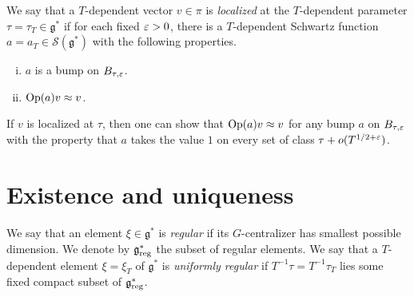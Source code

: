 \documentclass[reqno]{amsart} 
\numberwithin{equation}{section}
\numberwithin{theorem}{section}
\begin{document}
\begin{definition}
  We say that a $T$-dependent vector $v \in \pi$ is \emph{localized} at the $T$-dependent parameter $\tau = \tau_T \in \mathfrak{g}^*$ if for each fixed $\varepsilon > 0$, there is a $T$-dependent Schwartz function $a = a_T \in \mathcal{S} (\mathfrak{g}^*)$ with the following properties.
  \begin{enumerate}[(i)]
  \item $a$ is a bump on $B_{\tau,\varepsilon}$.
  \item $\operatorname{Op}(a) v \approx v$.
  \end{enumerate}
\end{definition}
\begin{remark}
  If $v$ is localized at $\tau$, then one can show that $\operatorname{Op}(a) v \approx v$ for any bump $a$ on $B_{\tau,\varepsilon}$ with the property that $a$ takes the value $1$ on every set of class $\tau + o(T^{1/2+\varepsilon})$.
\end{remark}

\section{Existence and uniqueness}\label{sec:d1a8de61510d}

\begin{definition}
  We say that an element $\xi \in \mathfrak{g}^*$ is \emph{regular} if its $G$-centralizer has smallest possible dimension.  We denote by $\mathfrak{g}^*_{\operatorname{reg}}$ the subset of regular elements.  We say that a $T$-dependent element $\xi = \xi_T$ of $\mathfrak{g}^*$ is \emph{uniformly regular} if $T^{-1} \tau = T^{-1} \tau_T$ lies some fixed compact subset of $\mathfrak{g}^*_{\operatorname{reg}}$.
\end{definition}
\end{document}
